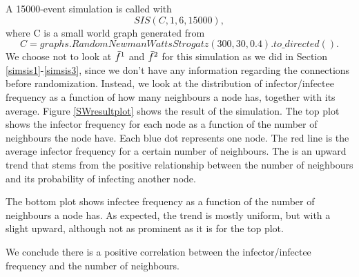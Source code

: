 \documentclass[12pt]{article} %
\numberwithin{equation}{section}
\begin{document}
A 15000-event simulation is called with $$SIS(C,1,6,15000),$$ where C is a small world graph generated from $$C = graphs.RandomNewmanWattsStrogatz(300,30,0.4).to\_directed().$$ We choose not to look at $\Bar{f}^1$ and $\Bar{f}^2$ for this simulation as we did in Section \ref{simsis1}-\ref{simsis3}, since we don't have any information regarding the connections before randomization. Instead, we look at the distribution of infector/infectee frequency as a function of how many neighbours a node has, together with its average.
Figure \ref{SWresultplot} shows the result of the simulation. The top plot shows the infector frequency for each node as a function of the number of neighbours the node have. Each blue dot represents one node. The red line is the average infector frequency for a certain number of neighbours. The is an upward trend that stems from the positive relationship between the number of neighbours and its probability of infecting another node.

The bottom plot shows infectee frequency as a function of the number of neighbours a node has. As expected, the trend is mostly uniform, but with a slight upward, although not as prominent as it is for the top plot. 

We conclude there is a positive correlation between the infector/infectee frequency and the number of neighbours.
\end{document}
